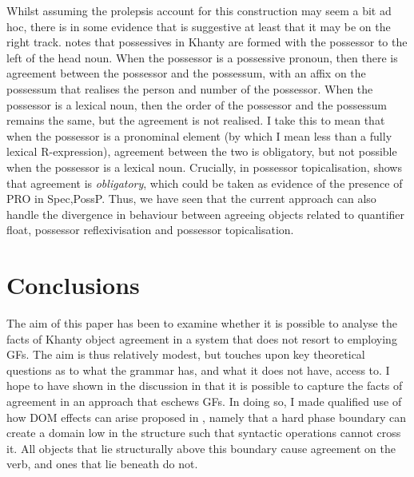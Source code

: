 \documentclass[output=paper
,modfonts
,nonflat]{langsci/langscibook}
\begin{document}
Whilst assuming the prolepsis account for this construction may seem a bit ad hoc, there is in some evidence that is suggestive at least that it may be on the right track.
\citet[][345]{nikolaeva1999} notes that possessives in Khanty are formed with the possessor to the left of the head noun.
When the possessor is a possessive pronoun, then there is agreement between the possessor and the possessum, with an affix on the possessum that realises the person and number of the possessor.
When the possessor is a lexical noun, then the order of the possessor and the possessum remains the same, but the agreement is not realised.
I take this to mean that when the possessor is a pronominal element (by which I mean less than a fully lexical R-expression), agreement between the two is obligatory, but not possible when the possessor is a lexical noun. Crucially, in possessor topicalisation, \citeauthor{nikolaeva1999} shows that agreement is \textit{obligatory}, which could be taken as evidence of the presence of PRO in Spec,PossP.
Thus, we have seen that the current approach can also handle the divergence in behaviour between agreeing objects related to quantifier float, possessor reflexivisation and possessor topicalisation.

\ea
\begin{multicols}{2}
	\z
\end{multicols}
\z

\section{Conclusions}\label{conclusion}

The aim of this paper has been to examine whether it is possible to analyse the facts of Khanty object agreement in a system that does not resort to employing GFs.
The aim is thus relatively modest, but touches upon key theoretical questions as to what the grammar has, and what it does not have, access to.
I hope to have shown in the discussion in  that it is possible to capture the facts of agreement in an approach that eschews GFs.
In doing so, I made qualified use of how DOM effects can arise proposed in \citet{Baker2015}, namely that a hard phase boundary can create a domain low in the structure such that syntactic operations cannot cross it.
All objects that lie structurally above this boundary cause agreement on the verb, and ones that lie beneath do not.
\end{document}
